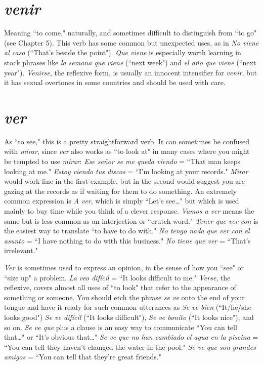 \section{\emph{venir}}

Meaning ``to come," naturally, and sometimes difficult to distinguish from ``to go" (see Chapter 5). This verb has some common
but unexpected uses, as in \emph{No viene al caso} (``That's beside the point").
\emph{Que viene} is especially worth learning in stock phrases like \emph{la semana
que viene} (``next week") and \emph{el año que viene} (``next year"). \emph{Venirse},
the reflexive form, is usually an innocent intensifier for \emph{venir}, but it
has sexual overtones in some countries and should be used with care.

\section{\emph{ver}}

As ``to see," this is a pretty straightforward verb. It can sometimes be confused with \emph{mirar}, since \emph{ver} also works as ``to look at" in
many cases where you might be tempted to use \emph{mirar}: \emph{Ese señor se me
queda viendo} = ``That man keeps looking at me." \emph{Estoy viendo tus
discos} = ``I'm looking at your records." \emph{Mirar} would work fine in the
first example, but in the second would suggest you are gazing at the
records as if waiting for them to do something. An extremely common
expression is \emph{A ver}, which is simply ``Let's see\ldots{}" but which is used
mainly to buy time while you think of a clever response. \emph{Vamos a
ver} means the same but is less common as an interjection or ``crutch
word." \emph{Tener que ver con} is the easiest way to translate ``to have to do
with." \emph{No tengo nada que ver con el asunto} = ``I have nothing to do
with this business." \emph{No tiene que ver} = ``That's irrelevant."

\emph{Ver} is sometimes used to express an opinion, in the sense of
how you ``see" or ``size up" a problem. \emph{La veo difícil} = ``It looks difficult to me." \emph{Verse}, the reflexive, covers almost all uses of ``to look"
that refer to the appearance of something or someone. You should etch
the phrase \emph{se ve} onto the end of your tongue and have it ready for such
common utterances as \emph{Se ve bien} (``It/he/she looks good") \emph{Se ve difícil}
(``It looks difficult"), \emph{Se ve bonito} (``It looks nice"), and so on. \emph{Se ve que}
plus a clause is an easy way to communicate ``You can tell that\ldots{}" or
``It's obvious that\ldots{}" \emph{Se ve que no han cambiado el agua en la piscina} = ``You can tell they haven't changed the water in the pool." \emph{Se
ve que son grandes amigos} = ``You can tell that they're great friends."

